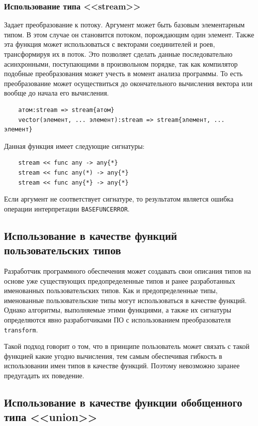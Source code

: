 \subsubsection{Использование типа <<stream>>}

Задает преобразование к потоку. Аргумент может быть базовым элементарным типом. В этом случае он становится потоком, порождающим один элемент. Также эта функция может использоваться с векторами соединителей и роев, трансформируя их в поток. Это позволяет сделать данные последовательно асинхронными, поступающими в произвольном порядке, так как компилятор подобные преобразования может учесть в момент анализа программы. То есть преобразование может осуществиться до окончательного вычисления вектора или вообще до начала его вычисления.
\begin{verbatim}
    атом:stream => stream{атом}
    vector(элемент, ... элемент):stream => stream{элемент, ... элемент}
\end{verbatim}

Данная функция имеет следующие сигнатуры:
\begin{verbatim}
    stream << func any -> any{*}
    stream << func any(*) -> any{*}
    stream << func any{*} -> any{*}
\end{verbatim}
Если аргумент не соответствует сигнатуре, то результатом является ошибка операции интерпретации \verb|BASEFUNCERROR|.

\subsection{Использование в качестве функций пользовательских типов}

Разработчик программного обеспечения может создавать свои описания типов на основе уже существующих предопределенные типов и ранее разработанных именованных пользовательских типов. Как и предопределенные типы, именованные пользовательские типы могут использоваться в качестве функций. Однако алгоритмы, выполняемые этими функциями, а также их сигнатуры определяются явно разработчиками ПО с использованием преобразователя \verb|transform|.

Такой подход говорит о том, что в принципе пользователь может связать с такой функцией какие угодно вычисления, тем самым обеспечивая гибкость в использовании имен типов в качестве функций. Поэтому невозможно заранее предугадать их поведение.

\subsection{Использование в качестве функции обобщенного типа <<union>>}

